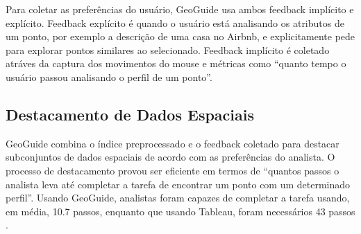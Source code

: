 Para coletar as preferências do usuário, GeoGuide usa ambos feedback implícito e explícito. Feedback explícito é quando o usuário está analisando os atributos de um ponto, por exemplo a descrição de uma casa no Airbnb, e explicitamente pede para explorar pontos similares ao selecionado. Feedback implícito é coletado atráves da captura dos movimentos do mouse e métricas como  ``quanto tempo o usuário passou analisando o perfil de um ponto''.

\subsection{Destacamento de Dados Espaciais}

GeoGuide combina o índice preprocessado e o feedback coletado para destacar subconjuntos de dados espaciais de acordo com as preferências do analista. O processo de destacamento provou ser eficiente em termos de ``quantos passos o analista leva até completar a tarefa de encontrar um ponto com um determinado perfil''. Usando GeoGuide, analistas foram capazes de completar a tarefa usando, em média, 10.7 passos, enquanto que usando Tableau, foram necessários 43 passos \cite{omidvarTehrani2017}.


